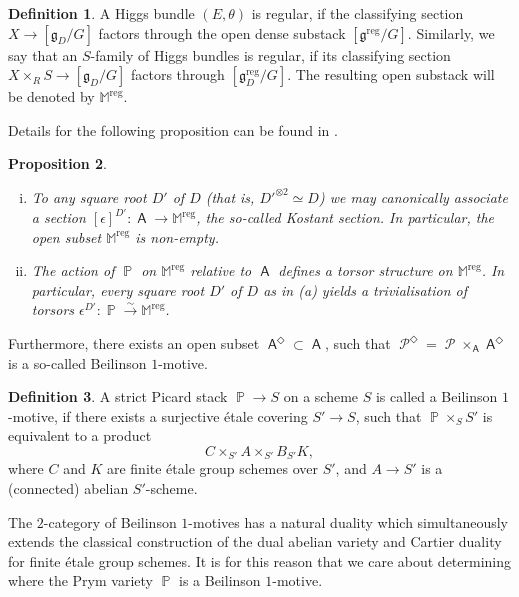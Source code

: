 \documentclass{article}
\DeclareMathOperator{\reg}{reg}
\DeclareMathOperator{\A}{\mathsf{A}}
\DeclareMathOperator{\Pb}{\mathbb{P}}
\DeclareMathOperator{\Pc}{\mathcal{P}}
\newcommand{\g}{\mathfrak{g} }
\theoremstyle{definition}
\newtheorem{definition}{Definition}[section]
\theoremstyle{plain}
\newtheorem{proposition}[definition]{Proposition}
\begin{document}
\begin{definition}
A Higgs bundle $(E,\theta)$ is regular, if the classifying section $X \to [\mathfrak{g}_D/G]$ factors through the open dense substack $[\mathfrak{g}^{\reg}/G]$. Similarly, we say that an $S$-family of Higgs bundles is regular, if its classifying section $X \times_R S \to [\g_D / G]$ factors through $[\g^{\reg}_D/G]$. The resulting open substack will be denoted by $\mathbb{M}^{\reg}$.
\end{definition}

Details for the following proposition can be found in \cite[4.2.4 and Proposition 4.3.3]{MR2653248}.

\begin{proposition}\label{prop:kostant}
\begin{enumerate}[(i)]
\item To any square root $D'$ of $D$ (that is, $D'^{\otimes 2} \simeq D$) we may canonically associate a section $[\epsilon]^{D'}\colon \A \to \mathbb{M}^{\reg}$, the so-called \emph{Kostant section}. In particular, the open subset $\mathbb{M}^{\reg}$ is non-empty. 
\item The action of $\Pb$ on $\mathbb{M}^{\reg}$ relative to $\A$ defines a torsor structure on $\mathbb{M}^{\reg}$. In particular, every square root $D'$ of $D$ as in (a) yields a trivialisation of torsors $\epsilon^{D'}\colon \Pb \xrightarrow{\sim} \mathbb{M}^{\reg}$.
\end{enumerate}
\end{proposition}

Furthermore, there exists an open subset $\A^{\Diamond} \subset \A$, such that $\Pc^{\Diamond} = \Pc \times_{\A} \A^{\Diamond}$ is a so-called Beilinson $1$-motive.

\begin{definition}\label{beil}
A strict Picard stack $\Pb\to S$ on a scheme $S$ is called a Beilinson $1$-motive, if there exists a surjective \'etale covering $S' \to S$, such that $\Pb \times_S S'$ is equivalent to a product 
$$C \times_{S'} A \times_{S'} B_{S'}K,$$
where $C$ and $K$ are finite \'etale group schemes over $S'$, and $A \to S'$ is a (connected) abelian $S'$-scheme.
\end{definition} 

The $2$-category of Beilinson $1$-motives has a natural duality which simultaneously extends the classical construction of the dual abelian variety and Cartier duality for finite \'etale group schemes. It is for this reason that we care about determining where the Prym variety $\Pb$ is a Beilinson $1$-motive.
\end{document}
